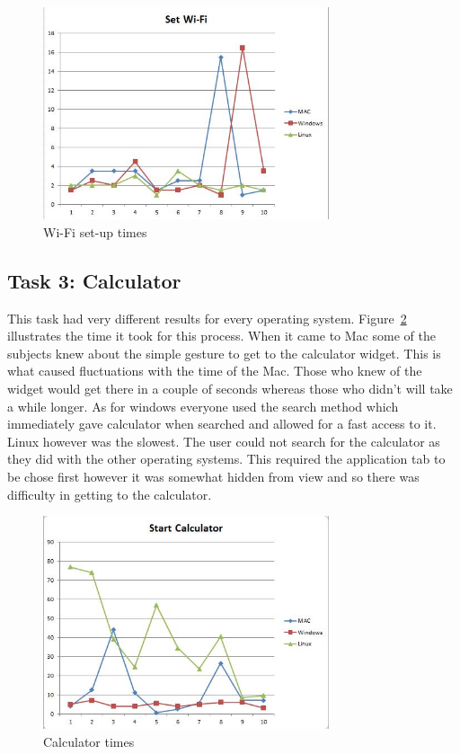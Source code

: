 \documentclass[11pt]{article}
\begin{document}
\begin{figure}[h!]
  \centering
    \includegraphics[width=0.75\textwidth]{./Images/Wi-Fi}
  \caption{Wi-Fi set-up times}
 \label{Wi-Fi}
\end{figure}


\subsection{Task 3: Calculator}
This task had very different results for every operating system. Figure~\ref{Calc} illustrates the time it took for this process. When it came to Mac some of the subjects knew about the simple gesture to get to the calculator widget. This is what caused fluctuations with the time of the Mac. Those who knew of the widget would get there in a couple of seconds whereas those who didn’t will take a while longer. As for windows everyone used the search method which immediately gave calculator when searched and allowed for a fast access to it. Linux however was the slowest. The user could not search for the calculator as they did with the other operating systems. This required the application tab to be chose first however it was somewhat hidden from view and so there was difficulty in getting to the calculator.

\begin{figure}[h!]
  \centering
    \includegraphics[width=0.75\textwidth]{./Images/Calculator}
  \caption{Calculator times}
 \label{Calc}
\end{figure}
\end{document}
